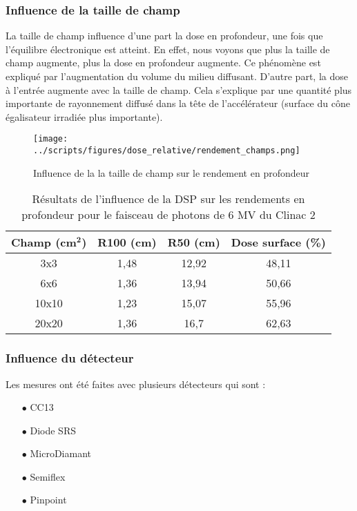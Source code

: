 \documentclass{article}
\begin{document}
\subsubsection{Influence de la taille de champ}

La taille de champ influence d'une part la dose en profondeur, une fois que l'équilibre électronique est atteint. En effet, nous voyons que plus la taille de champ augmente, plus la dose en profondeur augmente. Ce phénomène est expliqué par l'augmentation du volume du milieu diffusant. D'autre part, la dose à l'entrée augmente avec la taille de champ. Cela s'explique par une quantité plus importante de rayonnement diffusé dans la tête de l'accélérateur (surface du cône égalisateur irradiée plus importante).

\begin{figure}[h!]
  \centering
  \texttt{[image: ../scripts/figures/dose\_relative/rendement\_champs.png]}
  \caption{Influence de la la taille de champ sur le rendement en profondeur}
  \label{fig_rdt_champ}
\end{figure}

\begin{table}[h]
  \centering
  \begin{tabular}{cccc}
    \toprule
    \textbf{Champ (cm}$\mathbf{^2}$\textbf{)} & \textbf{R100 (cm)} & \textbf{R50 (cm)} & \textbf{Dose surface (\%)} \\
    \toprule
    3x3 & 1,48 & 12,92 & 48,11 \\
    6x6 & 1,36 & 13,94 &  50,66 \\
    10x10 & 1,23 & 15,07 & 55,96 \\
    20x20 & 1,36 & 16,7 & 62,63 \\
    \bottomrule
  \end{tabular}
  \caption{Résultats de l'influence de la DSP sur les rendements en profondeur pour le faisceau de photons de 6 MV du Clinac 2}
  \label{table_rdt_dsp}
\end{table}

\subsubsection{Influence du détecteur}

Les mesures ont été faites avec plusieurs détecteurs qui sont :

\begin{itemize}
  \item[$\bullet$] CC13
  \item[$\bullet$] Diode SRS
  \item[$\bullet$] MicroDiamant
  \item[$\bullet$] Semiflex
  \item[$\bullet$] Pinpoint
\end{itemize}
\end{document}
